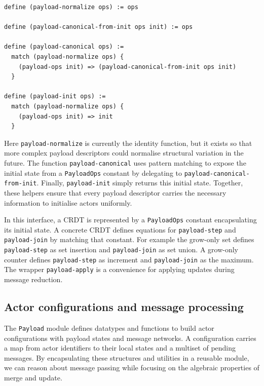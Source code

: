 \begin{lstlisting}[language=Athena,style=athena]
define (payload-normalize ops) := ops

define (payload-canonical-from-init ops init) := ops

define (payload-canonical ops) :=
  match (payload-normalize ops) {
    (payload-ops init) => (payload-canonical-from-init ops init)
  }

define (payload-init ops) :=
  match (payload-normalize ops) {
    (payload-ops init) => init
  }
\end{lstlisting}

\noindent Here \lstinline{payload-normalize} is currently the identity function, but it exists so that more complex payload descriptors could normalise structural variation in the future.  The function \lstinline{payload-canonical} uses pattern matching to expose the initial state from a \lstinline{PayloadOps} constant by delegating to \lstinline{payload-canonical-from-init}.  Finally, \lstinline{payload-init} simply returns this initial state.  Together, these helpers ensure that every payload descriptor carries the necessary information to initialise actors uniformly.

\noindent In this interface, a CRDT is represented by a \lstinline{PayloadOps} constant encapsulating its initial state.  A concrete CRDT defines equations for \lstinline{payload-step} and \lstinline{payload-join} by matching that constant.  For example the grow-only set defines \lstinline{payload-step} as set insertion and \lstinline{payload-join} as set union. A grow-only counter defines \lstinline{payload-step} as increment and \lstinline{payload-join} as the maximum.  The wrapper \lstinline{payload-apply} is a convenience for applying updates during message reduction.

\subsection{Actor configurations and message processing}

The \texttt{Payload} module defines datatypes and functions to build actor configurations with payload states and message networks.  A configuration carries a map from actor identifiers to their local states and a multiset of pending messages.  By encapsulating these structures and utilities in a reusable module, we can reason about message passing while focusing on the algebraic properties of merge and update.

